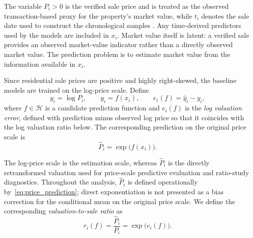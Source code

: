 \documentclass[10pt]{article}
\theoremstyle{definition}
\newcommand{\1}{\mathbf{1}}
\begin{document}
{The variable $P_i>0$ is the verified sale price and is treated as the observed transaction-based proxy for the property's market value, while $t_i$ denotes the sale date used to construct the chronological samples \cite{CCAOModelResAVM2026,IAAO2026ExposureRatio}. Any time-derived predictors used by the models are included in $x_i$. Market value itself is latent: a verified sale provides an observed market-value indicator rather than a directly observed market value. The prediction problem is to estimate market value from the information available in $x_i$.}

Since residential sale prices are positive and highly right-skewed, the baseline models are trained on the log-price scale. Define
\begin{equation}
\label{eq:prediction_scale}
y_i=\log P_i,
\qquad
\widehat{y}_i=f(x_i),
\qquad
e_i(f)=\widehat{y}_i-y_i,
\end{equation}
{where $f\in\mathcal{H}$ is a candidate prediction function and $e_i(f)$ is the \emph{log valuation error}, defined with prediction minus observed log price so that it coincides with the log valuation ratio below.}
The corresponding prediction on the original price scale is
\begin{equation}
\label{eq:price_prediction}
\widehat{P}_i=\exp\bigl(f(x_i)\bigr).
\end{equation}



{The log-price scale is the estimation scale, whereas $\widehat{P}_i$ is the directly retransformed valuation used for price-scale predictive evaluation and ratio-study diagnostics. Throughout the analysis, $\widehat{P}_i$ is defined operationally by~\eqref{eq:price_prediction}; direct exponentiation is not presented as a bias correction for the conditional mean on the original price scale. We define the corresponding \emph{valuation-to-sale ratio} as}
\begin{equation}
\label{eq:valuation_ratio}
r_i(f)
=
\frac{\widehat{P}_i}{P_i}
=
\exp\bigl(e_i(f)\bigr).
\end{equation}
\end{document}
